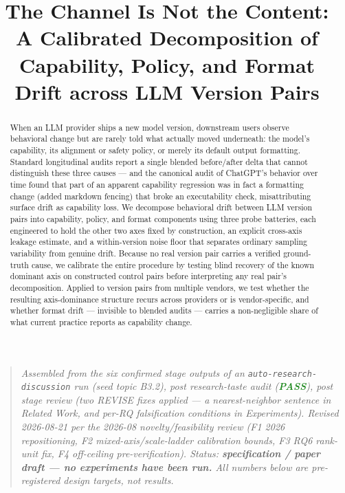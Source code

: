 \documentclass[11pt]{article}
\title{\textbf{The Channel Is Not the Content:\\ A Calibrated Decomposition of Capability, Policy, and Format Drift across LLM Version Pairs}}
\author{}
\date{}
\begin{document}
\maketitle
\vspace{-2em}

\begin{quote}
\small\textit{Assembled from the six confirmed stage outputs of an \texttt{auto-research-discussion} run (seed topic B3.2), post research-taste audit (\textcolor{ForestGreen}{\textbf{PASS}}), post stage review (two REVISE fixes applied --- a nearest-neighbor sentence in Related Work, and per-RQ falsification conditions in Experiments). Revised 2026-08-21 per the 2026-08 novelty/feasibility review (F1 2026 repositioning, F2 mixed-axis/scale-ladder calibration bounds, F3 RQ6 rank-unit fix, F4 off-ceiling pre-verification). Status: \textbf{specification / paper draft --- no experiments have been run.} All numbers below are pre-registered design targets, not results.}
\end{quote}

\begin{abstract}
When an LLM provider ships a new model version, downstream users observe behavioral change but are rarely told what actually moved underneath: the model's capability, its alignment or safety policy, or merely its default output formatting. Standard longitudinal audits report a single blended before/after delta that cannot distinguish these three causes --- and the canonical audit of ChatGPT's behavior over time found that part of an apparent capability regression was in fact a formatting change (added markdown fencing) that broke an executability check, misattributing surface drift as capability loss. We decompose behavioral drift between LLM version pairs into capability, policy, and format components using three probe batteries, each engineered to hold the other two axes fixed by construction, an explicit cross-axis leakage estimate, and a within-version noise floor that separates ordinary sampling variability from genuine drift. Because no real version pair carries a verified ground-truth cause, we calibrate the entire procedure by testing blind recovery of the known dominant axis on constructed control pairs before interpreting any real pair's decomposition. Applied to version pairs from multiple vendors, we test whether the resulting axis-dominance structure recurs across providers or is vendor-specific, and whether format drift --- invisible to blended audits --- carries a non-negligible share of what current practice reports as capability change.
\end{abstract}
\end{document}
